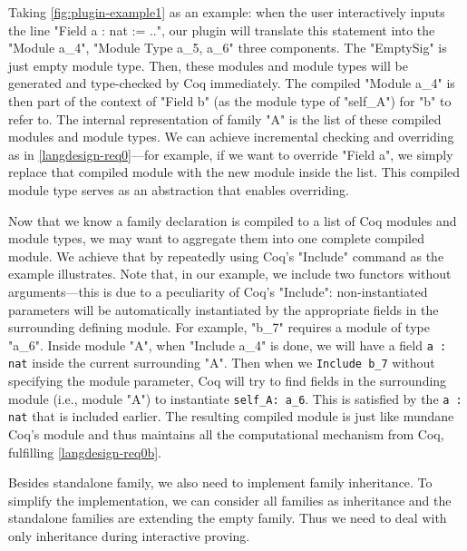 Taking \cref{fig:plugin-example1} as an example: when the user
interactively inputs the line "Field a : nat := ..", our plugin will
translate this statement into the "Module a_4", "Module Type a_5, a_6"
three components.
{The "EmptySig" is just empty module type.} Then,
these modules and module types will be generated and type-checked by Coq
immediately. The compiled "Module a_4" is then part of the context of
"Field b" (as the module type of "self_A") for "b" to refer to. The
internal representation of family "A" is the list of these
compiled modules and module types. We can achieve incremental
checking and overriding as in \ref{langdesign-req0}---for example, if we
want to override "Field a", we simply replace that compiled module with
the new module inside the list. This compiled module type serves as an
abstraction that enables overriding.

Now that we know a family declaration is compiled to a list of Coq
modules and module types, we may want to aggregate them into one complete compiled
module.
We achieve that by repeatedly using Coq's "Include" command as
the example illustrates. Note that, in our example, we include two
functors without arguments---this is due to a peculiarity of Coq's
"Include": non-instantiated parameters will be automatically
instantiated by the appropriate fields in the surrounding defining
module.
For example, "b_7" requires a module of type "a_6". Inside module "A",
when "Include a_4" is done, we will have a field \texttt{a : nat}
inside the current surrounding "A". Then when we
\texttt{Include b_7} without specifying the module parameter,
Coq will try to find fields in the surrounding module (i.e., module
"A") to instantiate \texttt{self_A: a_6}. This is satisfied by
the \texttt{a : nat} that is included earlier.
The resulting compiled module is just like mundane Coq's module and thus maintains all the computational mechanism from Coq, fulfilling \ref{langdesign-req0b}. 



Besides standalone family, we also need to implement family inheritance.
To simplify the implementation, we can consider all families as
inheritance and the standalone families are extending the empty family.
Thus we need to deal with only inheritance during interactive proving. 

